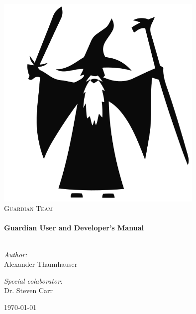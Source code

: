 
\begin{titlepage}
{
	\begin{center}
	{
		\includegraphics[width=0.75\textwidth]{./img/you-shall-not-pass}\\[1cm]
		
		\textsc{\LARGE Guardian Team}\\[1.5cm]
		
		\HRule \\[0.4cm]
		{ \huge \bfseries Guardian User and Developer's Manual}\\[0.4cm]
		\HRule \\[1.5cm]
		
		\begin{minipage}{0.4\textwidth}
		\begin{flushleft} \large
		\emph{Author:}\\
		Alexander Thannhauser
		\end{flushleft}
		\end{minipage}
		\begin{minipage}{0.4\textwidth}
		\begin{flushright} \large
		\emph{Special colaborator:} \\
		Dr. Steven Carr
		\end{flushright}
		\end{minipage}
		
		\vfill
		{\large \today}
	}
	\end{center}
}
\end{titlepage}
